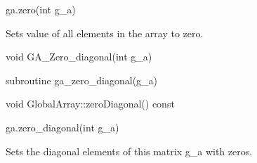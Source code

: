 \documentclass[12pt]{article}
\begin{document}
\begin{pyapi}
\begin{pycode}
ga.zero(int g_a)
\end{pycode}
\begin{funcargs}
\end{funcargs}
\end{pyapi}

\gcoll

\begin{desc}

Sets value of all elements in the array to zero.

\end{desc}


\begin{capi}
\begin{ccode}
void GA_Zero_diagonal(int g_a)
\end{ccode}
\begin{funcargs}
\end{funcargs}
\end{capi}

\begin{fapi}
\begin{fcode}
subroutine ga_zero_diagonal(g_a)
\end{fcode}
\begin{funcargs}
\end{funcargs}
\end{fapi}

\begin{cxxapi}
\begin{cxxcode}
void GlobalArray::zeroDiagonal() const
\end{cxxcode}
\end{cxxapi}

\begin{pyapi}
\begin{pycode}
ga.zero_diagonal(int g_a)
\end{pycode}
\begin{funcargs}
\end{funcargs}
\end{pyapi}

\gcoll

\begin{desc}
Sets the diagonal elements of this matrix g_a with zeros.
\end{desc}
\end{document}
